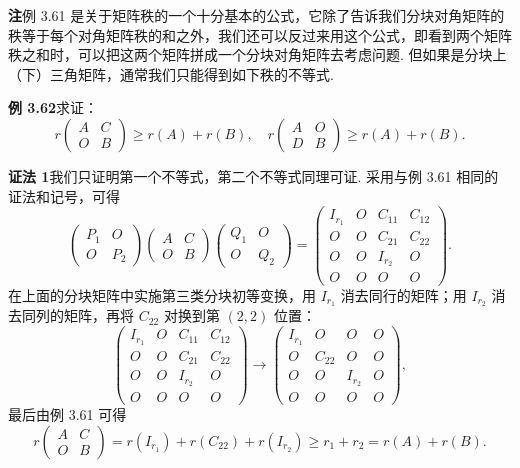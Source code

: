 \documentclass[UTF8, 12pt, fontset=fandol, oneside]{ctexart}
\begin{document}
\noindent\textbf{注}\quad 例 3.61 是关于矩阵秩的一个十分基本的公式，它除了告诉我们分块对角矩阵的秩等于每个对角矩阵秩的和之外，我们还可以反过来用这个公式，即看到两个矩阵秩之和时，可以把这两个矩阵拼成一个分块对角矩阵去考虑问题. 但如果是分块上（下）三角矩阵，通常我们只能得到如下秩的不等式.

\noindent\textbf{例 3.62}\quad 求证：
\[
r\begin{pmatrix}A&C\\O&B\end{pmatrix}\ge r(A)+r(B),\quad
r\begin{pmatrix}A&O\\D&B\end{pmatrix}\ge r(A)+r(B).
\]

\noindent\textbf{证法 1}\quad 我们只证明第一个不等式，第二个不等式同理可证. 采用与例 3.61 相同的证法和记号，可得
\[
\begin{pmatrix}P_1&O\\O&P_2\end{pmatrix}
\begin{pmatrix}A&C\\O&B\end{pmatrix}
\begin{pmatrix}Q_1&O\\O&Q_2\end{pmatrix}
=
\begin{pmatrix}
I_{r_1}&O&C_{11}&C_{12}\\
O&O&C_{21}&C_{22}\\
O&O&I_{r_2}&O\\
O&O&O&O
\end{pmatrix}.
\]
在上面的分块矩阵中实施第三类分块初等变换，用 $I_{r_1}$ 消去同行的矩阵；用 $I_{r_2}$ 消去同列的矩阵，再将 $C_{22}$ 对换到第 $(2,2)$ 位置：
\[
\begin{pmatrix}
I_{r_1}&O&C_{11}&C_{12}\\
O&O&C_{21}&C_{22}\\
O&O&I_{r_2}&O\\
O&O&O&O
\end{pmatrix}
\to
\begin{pmatrix}
I_{r_1}&O&O&O\\
O&C_{22}&O&O\\
O&O&I_{r_2}&O\\
O&O&O&O
\end{pmatrix},
\]
最后由例 3.61 可得
\[
r\begin{pmatrix}A&C\\O&B\end{pmatrix}=r(I_{r_1})+r(C_{22})+r(I_{r_2})\ge r_1+r_2=r(A)+r(B).
\]
\end{document}
